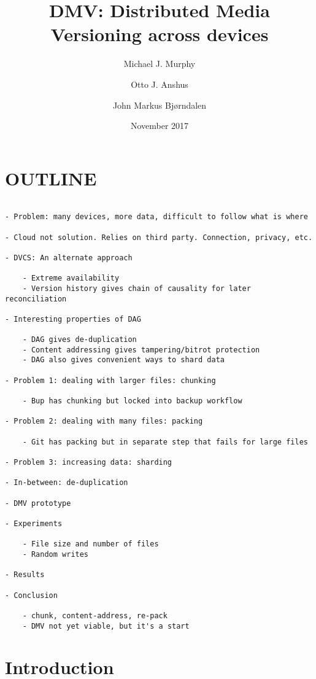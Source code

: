 \documentclass[usenglish]{nik}
\title{DMV: Distributed Media Versioning across devices}
\author{Michael J. Murphy \and Otto J. Anshus \and John Markus Bjørndalen}
\date{November 2017}
\begin{document}
\maketitle

\begin{abstract}

\end{abstract}

\section*{OUTLINE}

\begin{verbatim}

- Problem: many devices, more data, difficult to follow what is where

- Cloud not solution. Relies on third party. Connection, privacy, etc.

- DVCS: An alternate approach

    - Extreme availability
    - Version history gives chain of causality for later reconciliation

- Interesting properties of DAG

    - DAG gives de-duplication
    - Content addressing gives tampering/bitrot protection
    - DAG also gives convenient ways to shard data

- Problem 1: dealing with larger files: chunking

    - Bup has chunking but locked into backup workflow

- Problem 2: dealing with many files: packing

    - Git has packing but in separate step that fails for large files

- Problem 3: increasing data: sharding

- In-between: de-duplication

- DMV prototype

- Experiments

    - File size and number of files
    - Random writes

- Results

- Conclusion

    - chunk, content-address, re-pack
    - DMV not yet viable, but it's a start

\end{verbatim}

\section{Introduction}
\end{document}
